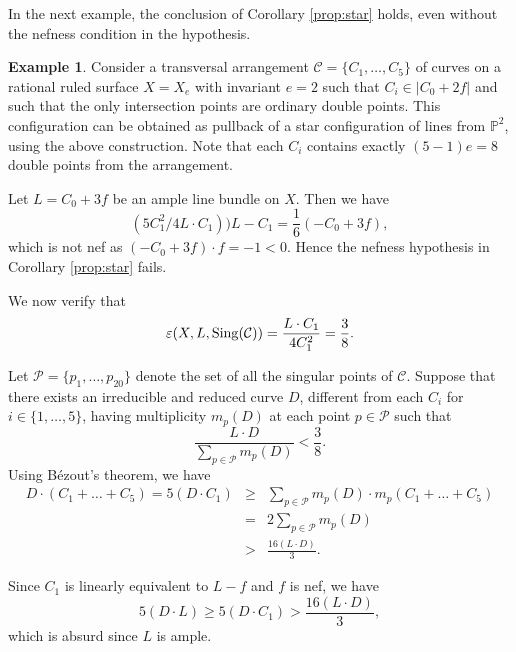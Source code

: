 \documentclass[12pt,reqno]{amsart}
\theoremstyle{plain}
\numberwithin{equation}{section}
\theoremstyle{definition}
\newtheorem{example}[theorem]{Example}
\begin{document}
	In the next example, the conclusion of Corollary \ref{prop:star} holds, even without the nefness condition in the hypothesis. 
	\begin{example}\label{nef}
		Consider a transversal arrangement $\mathcal{C} = \{C_{1}, \ldots, C_{5}\}$ of curves on a rational ruled surface $X=X_e$ with invariant $e=2$ such that $ C_i \in |C_0+2f|$ and such that the only intersection points are ordinary double points. This configuration can be obtained as pullback of a star configuration of lines from $\mathbb{P}^2$, using the above construction. Note that each $C_i$ contains exactly $(5-1)e=8$ double points from the arrangement.
		
 Let $L=C_0+3f$ be an ample line bundle on $X.$ Then we have $$(5C_1^2/4L\cdot C_1))L-C_1= \frac{1}{6}(-C_0+3f),$$ which is not nef as $(-C_0+3f)\cdot f = -1 < 0.$ Hence the nefness hypothesis in Corollary \ref{prop:star} fails. 
		
		We now verify that 
		$$\varepsilon(X, L,{\rm Sing}(\mathcal{C})) = \frac{L\cdot C_1}{4C_1^2}=\frac{3}{8}.$$
		
		Let $\mathcal{P} = \{p_{1}, \ldots, p_{20}\}$ denote the set of all the singular points of $\mathcal{C}$. Suppose that there exists an irreducible and reduced curve $D$, different from each $C_{i}$ for $i \in \{1,\ldots, 5\}$, having multiplicity $m_{p}(D)$ at each point $p \in \mathcal{P}$ such that
		\begin{equation}\label{eg ineq}
			\frac{L \cdot D}{\sum_{p \in \mathcal{P}} m_{p}(D)} < \frac{3}{8}.
		\end{equation}
		Using B\'ezout's theorem, we have
		\begin{eqnarray*}
		D\cdot (C_{1}+ \ldots + C_{5})=5(D\cdot C_1) &\geq& \sum_{p \in \mathcal{P}}m_{p}(D)\cdot m_{p}(C_1+\ldots+C_5)\\&=& 2\sum_{p \in \mathcal{P}} m_{p}(D)\\&>&\frac{16(L \cdot D)}{3}.\end{eqnarray*}
		
		Since $C_1$ is linearly equivalent to $L-f$ and $f$ is nef,  we have $$5(D \cdot L) \geq 5(D \cdot C_{1})> \frac{16(L \cdot D)}{3} ,$$ which is absurd since $L$ is ample.
		
	\end{example}
	
\end{document}
